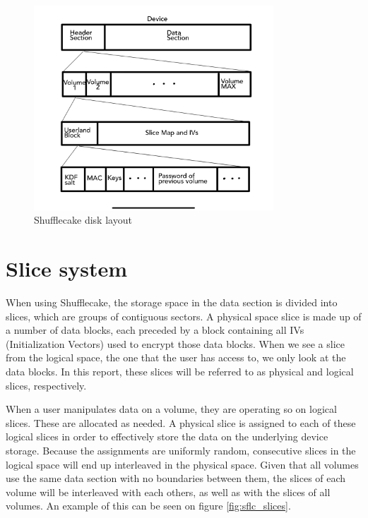 \documentclass[a4paper,11pt,oneside]{report}
\begin{document}
\begin{figure}[ht]
\centering
\includegraphics[width=0.8\textwidth]{Figures/sflc_layout.png}
\caption{Shufflecake disk layout}
\label{fig:sflc_layout}
\end{figure}

\section{Slice system}

When using Shufflecake, the storage space in the data section is divided into slices, which are groups of contiguous sectors. A physical space slice is made up of a number of data blocks, each preceded by a block containing all IVs (Initialization Vectors) used to encrypt those data blocks. When we see a slice from the logical space, the one that the user has access to, we only look at the data blocks. In this report, these slices will be referred to as physical and logical slices, respectively.

When a user manipulates data on a volume, they are operating so on logical slices. These are allocated as needed. A physical slice is assigned to each of these logical slices in order to effectively store the data on the underlying device storage. Because the assignments are uniformly random, consecutive slices in the logical space will end up interleaved in the physical space. Given that all volumes use the same data section with no boundaries between them, the slices of each volume will be interleaved with each others, as well as with the slices of all volumes. An example of this can be seen on figure \ref{fig:sflc_slices}.
\end{document}
